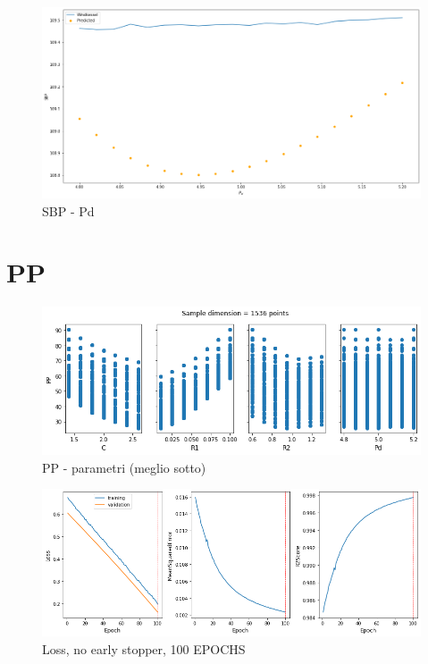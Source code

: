 \newpage

\begin{figure}[h]
    \centering
    \includegraphics[width=1\textwidth]{images/Training - temp/SBP - Pd.png}
    \caption{SBP - Pd}
\end{figure}










\newpage
\section{PP}

\begin{figure}[h]
    \centering
    \includegraphics[width=1\textwidth]{images/Training - temp/PP - parametri.png}
    \caption{PP - parametri (meglio sotto)}
\end{figure}


\newpage


\begin{figure}[h]
    \centering
    \includegraphics[width=1\textwidth]{images/Training - temp/PP - loss.png}
    \caption{Loss, no early stopper, 100 EPOCHS}
\end{figure}



